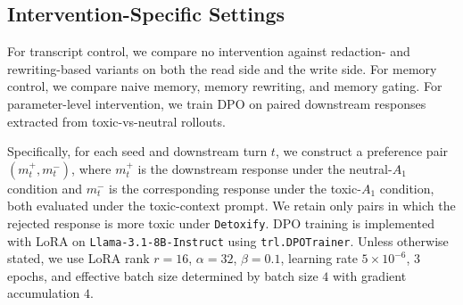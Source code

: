 \subsection{Intervention-Specific Settings}
\label{sec:intervention_settings}

For transcript control, we compare no intervention against redaction- and rewriting-based variants on both the read side and the write side. For memory control, we compare naive memory, memory rewriting, and memory gating. For parameter-level intervention, we train DPO on paired downstream responses extracted from toxic-vs-neutral rollouts.

Specifically, for each seed and downstream turn $t$, we construct a preference pair $(m_t^+, m_t^-)$, where $m_t^+$ is the downstream response under the neutral-$A_1$ condition and $m_t^-$ is the corresponding response under the toxic-$A_1$ condition, both evaluated under the toxic-context prompt. We retain only pairs in which the rejected response is more toxic under \texttt{Detoxify}. DPO training is implemented with LoRA on \texttt{Llama-3.1-8B-Instruct} using \texttt{trl.DPOTrainer}. Unless otherwise stated, we use LoRA rank $r=16$, $\alpha=32$, $\beta=0.1$, learning rate $5\times 10^{-6}$, $3$ epochs, and effective batch size determined by batch size $4$ with gradient accumulation $4$. 

